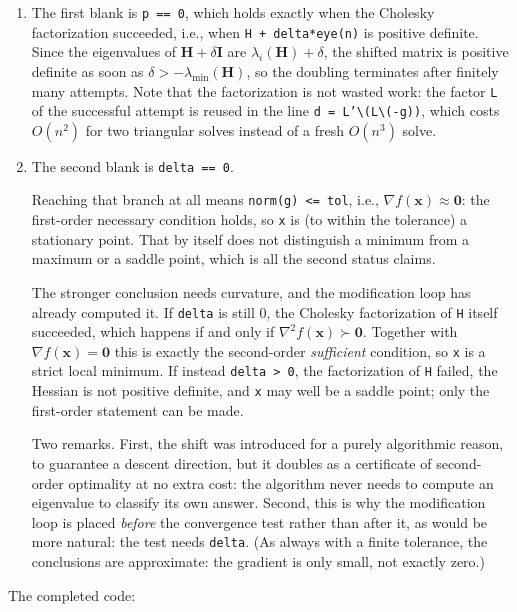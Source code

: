 \begin{solution}
\begin{enumerate}[label=(\alph*)]
        The loop in the code avoids all three problems: the shift is zero whenever $\mathbf{H}$ is already positive definite, and otherwise it is doubled until it is provably large enough.
        \item The first blank is \texttt{p == 0}, which holds exactly when the Cholesky factorization succeeded, i.e., when \texttt{H + delta*eye(n)} is positive definite. Since the eigenvalues of $\mathbf{H} + \delta\mathbf{I}$ are $\lambda_i(\mathbf{H}) + \delta$, the shifted matrix is positive definite as soon as $\delta > -\lambda_{\min}(\mathbf{H})$, so the doubling terminates after finitely many attempts. Note that the factorization is not wasted work: the factor \texttt{L} of the successful attempt is reused in the line \texttt{d = L'\textbackslash(L\textbackslash(-g))}, which costs $O(n^2)$ for two triangular solves instead of a fresh $O(n^3)$ solve.
        \item The second blank is \texttt{delta == 0}.

        Reaching that branch at all means \texttt{norm(g) <= tol}, i.e., $\nabla f(\mathbf{x}) \approx \mathbf{0}$: the first-order necessary condition holds, so \texttt{x} is (to within the tolerance) a stationary point. That by itself does not distinguish a minimum from a maximum or a saddle point, which is all the second status claims.

        The stronger conclusion needs curvature, and the modification loop has already computed it. If \texttt{delta} is still $0$, the Cholesky factorization of \texttt{H} itself succeeded, which happens if and only if $\nabla^2 f(\mathbf{x}) \succ \mathbf{0}$. Together with $\nabla f(\mathbf{x}) = \mathbf{0}$ this is exactly the second-order \emph{sufficient} condition, so \texttt{x} is a strict local minimum. If instead \texttt{delta > 0}, the factorization of \texttt{H} failed, the Hessian is not positive definite, and \texttt{x} may well be a saddle point; only the first-order statement can be made.

        Two remarks. First, the shift was introduced for a purely algorithmic reason, to guarantee a descent direction, but it doubles as a certificate of second-order optimality at no extra cost: the algorithm never needs to compute an eigenvalue to classify its own answer. Second, this is why the modification loop is placed \emph{before} the convergence test rather than after it, as would be more natural: the test needs \texttt{delta}. (As always with a finite tolerance, the conclusions are approximate: the gradient is only small, not exactly zero.)
    \end{enumerate}
    The completed code:
    
    
\end{solution}

